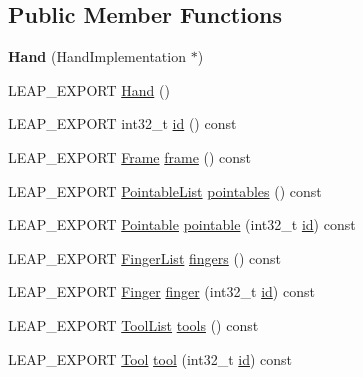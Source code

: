 \subsection*{Public Member Functions}
\begin{DoxyCompactItemize}
\item 
\hypertarget{class_leap_1_1_hand_a52cbd09a5d4f7677d5761d0eafa8c806}{{\bfseries Hand} (Hand\+Implementation $\ast$)}\label{class_leap_1_1_hand_a52cbd09a5d4f7677d5761d0eafa8c806}

\item 
L\+E\+A\+P\+\_\+\+E\+X\+P\+O\+R\+T \hyperlink{class_leap_1_1_hand_a56f41d7f4cded32073c7bec2cebe926d}{Hand} ()
\item 
L\+E\+A\+P\+\_\+\+E\+X\+P\+O\+R\+T int32\+\_\+t \hyperlink{class_leap_1_1_hand_a8df68a42fda7ced114f7112de746e40e}{id} () const 
\item 
L\+E\+A\+P\+\_\+\+E\+X\+P\+O\+R\+T \hyperlink{class_leap_1_1_frame}{Frame} \hyperlink{class_leap_1_1_hand_ad25bf2e94c06bcd8533921059097c95b}{frame} () const 
\item 
L\+E\+A\+P\+\_\+\+E\+X\+P\+O\+R\+T \hyperlink{class_leap_1_1_pointable_list}{Pointable\+List} \hyperlink{class_leap_1_1_hand_a78fa1e5a1134de8802c33d4bc40daee6}{pointables} () const 
\item 
L\+E\+A\+P\+\_\+\+E\+X\+P\+O\+R\+T \hyperlink{class_leap_1_1_pointable}{Pointable} \hyperlink{class_leap_1_1_hand_a93b1c53b8171640c93be27c7c4a3b2cb}{pointable} (int32\+\_\+t \hyperlink{class_leap_1_1_hand_a8df68a42fda7ced114f7112de746e40e}{id}) const 
\item 
L\+E\+A\+P\+\_\+\+E\+X\+P\+O\+R\+T \hyperlink{class_leap_1_1_finger_list}{Finger\+List} \hyperlink{class_leap_1_1_hand_a277253afc4b3e880d9514db5c64c10f2}{fingers} () const 
\item 
L\+E\+A\+P\+\_\+\+E\+X\+P\+O\+R\+T \hyperlink{class_leap_1_1_finger}{Finger} \hyperlink{class_leap_1_1_hand_ae542301c4cb54fd49e0c806089cc152d}{finger} (int32\+\_\+t \hyperlink{class_leap_1_1_hand_a8df68a42fda7ced114f7112de746e40e}{id}) const 
\item 
L\+E\+A\+P\+\_\+\+E\+X\+P\+O\+R\+T \hyperlink{class_leap_1_1_tool_list}{Tool\+List} \hyperlink{class_leap_1_1_hand_afacdaa91afb5bdbe39b37ed50ad8d479}{tools} () const 
\item 
L\+E\+A\+P\+\_\+\+E\+X\+P\+O\+R\+T \hyperlink{class_leap_1_1_tool}{Tool} \hyperlink{class_leap_1_1_hand_aaaeea14295e90b90ea94380c52fa3d85}{tool} (int32\+\_\+t \hyperlink{class_leap_1_1_hand_a8df68a42fda7ced114f7112de746e40e}{id}) const 

\end{DoxyCompactItemize}
